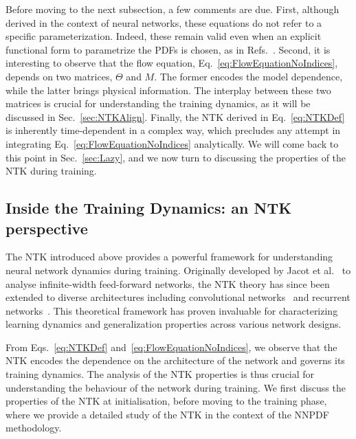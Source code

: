 Before moving to the next subsection, a few comments are due. First, although
derived in the context of neural networks, these equations do not refer to a
specific parameterization. Indeed, these remain valid even when an explicit
functional form to parametrize the PDFs is chosen, as \eg in
Refs.~\cite{Bailey:2020ooq,Hou:2019efy,Costantini:2025wxp}. Second, it is
interesting to observe that the flow equation,
Eq.~\eqref{eq:FlowEquationNoIndices}, depends on two matrices, $\Theta$ and $M$.
The former encodes the model dependence, while the latter brings physical
information. The interplay between these two matrices is crucial for
understanding the training dynamics, as it will be discussed in
Sec.~\ref{sec:NTKAlign}. Finally, the NTK derived in Eq.~\ref{eq:NTKDef} is
inherently time-dependent in a complex way, which precludes any attempt in
integrating Eq.~\ref{eq:FlowEquationNoIndices} analytically. We will come back
to this point in Sec.~\ref{sec:Lazy}, and we now turn to discussing the
properties of the NTK during training.

\subsection{Inside the Training Dynamics: an NTK perspective}

The NTK introduced above provides a powerful framework for understanding neural
network dynamics during training. Originally developed by Jacot et
al.~\cite{jacot2018neural} to analyse infinite-width feed-forward networks, the
NTK theory has since been extended to diverse architectures including
convolutional networks~\cite{arora2019exact} and recurrent
networks~\cite{alemohammad2021recurrent}. This theoretical framework has proven
invaluable for characterizing learning dynamics and generalization properties
across various network designs.

From Eqs.~\eqref{eq:NTKDef} and~\eqref{eq:FlowEquationNoIndices}, we observe
that the NTK encodes the dependence on the architecture of the network and
governs its training dynamics. The analysis of the NTK properties is thus
crucial for understanding the behaviour of the network during training. We first
discuss the properties of the NTK at initialisation, before moving to the
training phase, where we provide a detailed study of the NTK in the context of
the NNPDF methodology.

